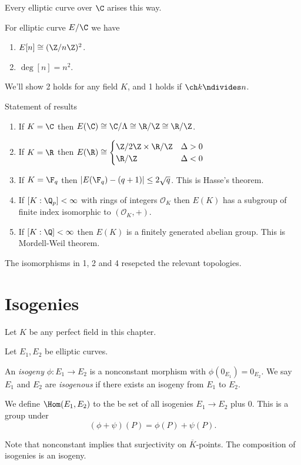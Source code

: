 \documentclass[a4paper]{article}
\theoremstyle{definition}
\begin{document}
\begin{theorem}
  Every elliptic curve over \(\C\) arises this way.
\end{theorem}

For elliptic curve \(E/\C\) we have
\begin{enumerate}
\item \(E[n] \cong (\Z/n\Z)^2\).
\item \(\deg [n] = n^2\).
\end{enumerate}
We'll show 2 holds for any field \(K\), and 1 holds if \(\ch k \ndivides n\).

Statement of results
\begin{enumerate}
\item If \(K = \C\) then \(E(\C) \cong \C/\Lambda \cong \R/\Z \cong \R/\Z\).
\item If \(K = \R\) then \(E(\R) \cong
  \begin{cases}
    \Z/2\Z \times \R/\Z & \Delta > 0 \\
    \R/\Z & \Delta < 0
  \end{cases}
  \)
\item If \(K = \F_q\) then \(|E(\F_q) - (q + 1)| \leq 2 \sqrt q\). This is Hasse's theorem.
\item If \([K: \Q_p] < \infty\) with rings of integers \(\mathcal O_K\) then \(E(K)\) has a subgroup of finite index isomorphic to \((\mathcal O_K, +)\).
\item If \([K: \Q] < \infty\) then \(E(K)\) is a finitely generated abelian group. This is Mordell-Weil theorem.
\end{enumerate}

\begin{remark}
  The isomorphisms in 1, 2 and 4 resepcted the relevant topologies.
\end{remark}

\section{Isogenies}

Let \(K\) be any perfect field in this chapter.

Let \(E_1, E_2\) be elliptic curves.

\begin{definition}[isogeny]
  An \emph{isogeny} \(\phi: E_1 \to E_2\) is a nonconstant morphism with \(\phi(0_{E_1}) = 0_{E_2}\). We say \(E_1\) and \(E_2\) are \emph{isogenous} if there exists an isogeny from \(E_1\) to \(E_2\).

  We define \(\Hom(E_1, E_2)\) to the be set of all isogenies \(E_1 \to E_2\) plus \(0\). This is a group under
  \[
    (\phi + \psi)(P) = \phi(P) + \psi(P).
  \]
\end{definition}
Note that nonconstant implies that surjectivity on \(\overline K\)-points. The composition of isogenies is an isogeny.
\end{document}
